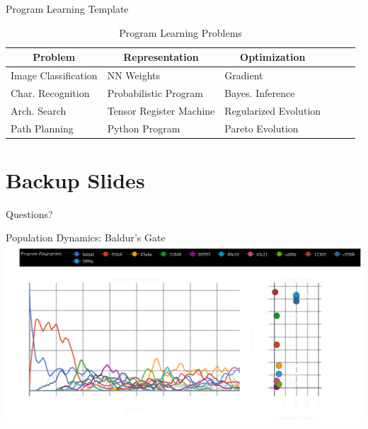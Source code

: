 \documentclass[aspectratio=169]{beamer}
\makeatletter
\newcommand{\red}[1]{{\color{pureminimalistic@text@red} #1}}
\makeatother
\begin{document}
\begin{frame}{Program Learning Template}
\begin{table}[h]
{\small 
\caption{Program Learning Problems}
\label{environments}
\begin{center}
\begin{tabular}{l|lllll}
\hline \hline
\multicolumn{1}{c}{\bf Problem}  & 
\multicolumn{1}{c}{\bf Representation} &  
\multicolumn{1}{c}{\bf Optimization} \\  
\hline
Image Classification & NN Weights              & Gradient \\
Char. Recognition    & Probabilistic Program   & Bayes. Inference \\
Arch. Search         & Tensor Register Machine & Regularized Evolution \\
Path Planning    & Python Program          & Pareto Evolution \\
\hline \hline
\end{tabular}
\end{center}}
\end{table}
\end{frame}

\begin{frame}[plain]{}
    \centering
    \vfill
    {\fontsize{40}{50}\selectfont \red{No Free Lunch}}
    \vfill
\end{frame}

\appendix %
\section*{Backup Slides}

\begin{frame}
  \centering
  \vfill
  {\fontsize{40}{50}\selectfont Questions?}
  \vfill
\end{frame}

\begin{frame}
  \centering
  \printbibliography
\end{frame}

\begin{frame}{Population Dynamics: Baldur's Gate}
    \includegraphics[width=1.0\linewidth, keepaspectratio]{figures/baldurs_pheno_50.pdf}
\end{frame}
\end{document}

